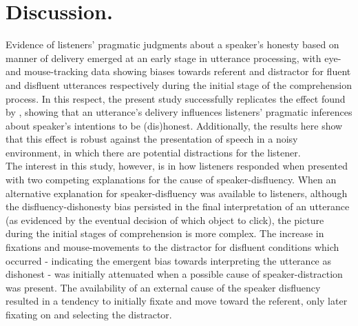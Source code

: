 \documentclass[man]{apa6}
\begin{document}
\section{Discussion.}

Evidence of listeners' pragmatic judgments about a speaker's honesty based on manner of delivery emerged at an early stage in utterance processing, with eye- and mouse-tracking data showing biases towards referent and distractor for fluent and disfluent utterances respectively during the initial stage of the comprehension process. 
In this respect, the present study successfully replicates the effect found by \citet{Loy2016}, showing that an utterance's delivery influences listeners' pragmatic inferences about speaker's intentions to be (dis)honest. 
Additionally, the results here show that this effect is robust against the presentation of speech in a noisy environment, in which there are potential distractions for the listener. 
\\

The interest in this study, however, is in how listeners responded when presented with two competing explanations for the cause of speaker-disfluency. 
When an alternative explanation for speaker-disfluency was available to listeners, although the disfluency-dishonesty bias persisted in the final interpretation of an utterance (as evidenced by the eventual decision of which object to click), the picture during the initial stages of comprehension is more complex. 
The increase in fixations and mouse-movements to the distractor for disfluent conditions which occurred - indicating the emergent bias towards interpreting the utterance as dishonest - was initially attenuated when a possible cause of speaker-distraction was present. 
The availability of an external cause of the speaker disfluency resulted in a tendency to initially fixate and move toward the referent, only later fixating on and selecting the distractor. \\
\end{document}
